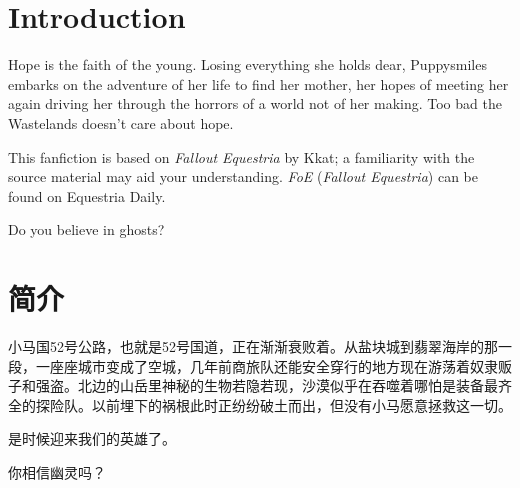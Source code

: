 \chapter{Introduction}

\pagestyle{english}

\begin{english}

Hope is the faith of the young. Losing everything she holds dear, Puppysmiles embarks on the adventure of her life to find her mother, her hopes of meeting her again driving her through the horrors of a world not of her making. Too bad the Wastelands doesn't care about hope.

This fanfiction is based on \emph{Fallout Equestria} by Kkat; a familiarity with the source material may aid your understanding. \emph{FoE} (\emph{Fallout Equestria}) can be found on Equestria Daily.

\clearpage

\begin{motto}
Do you believe in ghosts?
\end{motto}

\end{english}

\layoutchinese

\chapter{简介}

\pagestyle{chinese}

小马国52号公路，也就是52号国道，正在渐渐衰败着。从盐块城到翡翠海岸的那一段，一座座城市变成了空城，几年前商旅队还能安全穿行的地方现在游荡着奴隶贩子和强盗。北边的山岳里神秘的生物若隐若现，沙漠似乎在吞噬着哪怕是装备最齐全的探险队。以前埋下的祸根此时正纷纷破土而出，但没有小马愿意拯救这一切。

是时候迎来我们的英雄了。

\clearpage

\begin{motto}
你相信幽灵吗？
\end{motto}


